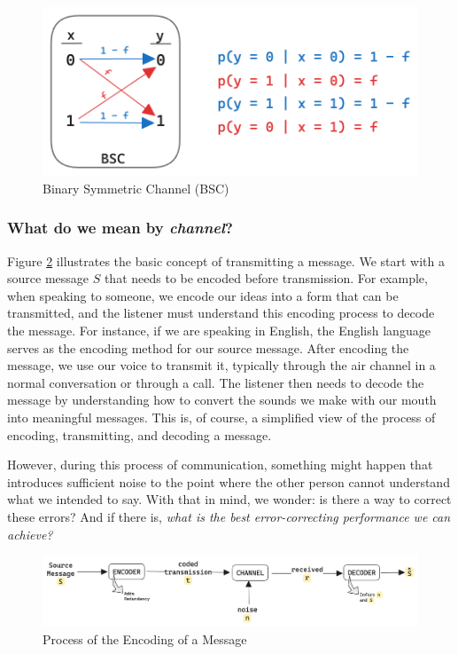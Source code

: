 \documentclass[a4paper,10pt]{article}
\newcommand{\hlt}[1]{\colorbox{color3}{#1}}
\begin{document}
\begin{figure}[ht]
\centering
\includegraphics[width=0.6\linewidth]{Figures/bsc.png}
\caption{Binary Symmetric Channel (BSC)}
\label{fig:bsc}
\end{figure}



\subsubsection{What do we mean by \emph{channel}?}

Figure \ref{fig:encoder_schematic} illustrates the basic concept of transmitting a message. We start with a source message \( S \) that needs to be encoded before transmission. For example, when speaking to someone, we encode our ideas into a form that can be transmitted, and the listener must understand this encoding process to decode the message. For instance, if we are speaking in English, the English language serves as the encoding method for our source message. After encoding the message, we use our voice to transmit it, typically through the air channel in a normal conversation or through a call. The listener then needs to decode the message by understanding how to convert the sounds we make with our mouth into meaningful messages. This is, of course, a simplified view of the process of encoding, transmitting, and decoding a message. 

However, during this process of communication, something might happen that introduces sufficient noise to the point where the other person cannot understand what we intended to say. With that in mind, we wonder: is there a way to correct these errors? And if there is, \textit{what is the \hlt{best error-correcting} performance we can achieve?}

\begin{figure}[ht]
\centering
\includegraphics[width=\linewidth]{Figures/encoder_schematic.png}
\caption{Process of the Encoding of a Message}
\label{fig:encoder_schematic}
\end{figure}
\end{document}
